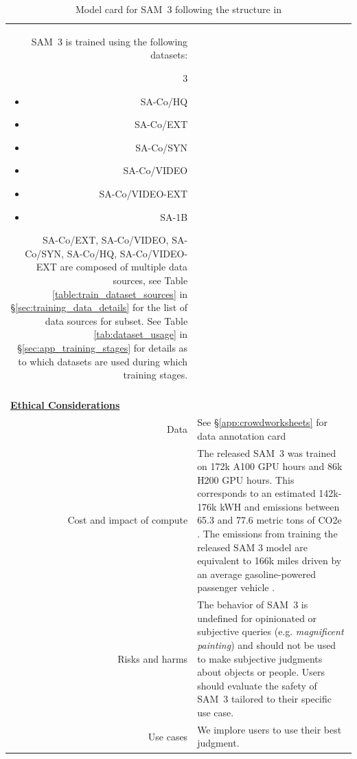 \documentclass[]{fairmeta}
\newcommand{\model}{SAM~3\xspace}
\newcommand{\dsname}{{SA-Co}\xspace}
\newcommand{\trainhq}{{\dsname/HQ}\xspace}
\newcommand{\trainsyn}{{\dsname/SYN}\xspace}
\newcommand{\trainext}{{\dsname/EXT}\xspace}
\newcommand{\trainvid}{{\dsname/VIDEO}\xspace}
\begin{document}
\begin{table}[!htbp]
\begin{tabular*}{\linewidth}{r|p{10cm}}
\model is trained using the following datasets:
\vspace{-1em}
\begin{multicols}{3}
\begin{itemize}
    \item \trainhq
    \item \trainext
    \item \trainsyn
    \item \trainvid
    \item \trainvid-EXT
    \item SA-1B
\end{itemize}
\end{multicols}
\vspace{-0.75em}
\trainext, \trainvid, \trainsyn, \trainhq,  \trainvid-EXT are composed of multiple data sources, see Table \ref{table:train_dataset_sources} in \S \ref{sec:training_data_details} for the list of data sources for subset. See Table \ref{tab:dataset_usage} in \S \ref{sec:app_training_stages} for details as to which datasets are used during which training stages. 
\\
\multicolumn{2}{c}{} \\
\multicolumn{2}{l}{\bf\underline{Ethical Considerations}} \\
Data &
See \S \ref{app:crowdworksheets} for data annotation card\\

Cost and impact of compute & The released \model was trained on 172k A100 GPU hours and 86k H200 GPU hours. This corresponds to an estimated 142k-176k kWH and emissions between 65.3 and 77.6 metric tons of CO2e \citep{patterson2021carbon, lacoste2019quantifying}. The emissions from training the released SAM 3 model are equivalent to 166k miles driven by an average gasoline-powered passenger vehicle \citep{epa2022}. \\
Risks and harms & The behavior of \model is undefined for opinionated or subjective queries (e.g. \textit{magnificent painting}) and should not be used to make subjective judgments about objects or people. Users should evaluate the safety of \model tailored to their specific use case.  \\
Use cases &  We implore users to use their best judgment. \\
\end{tabular*}
\label{tab:modelcard}

\caption{Model card for \model following the structure in \citep{mitchell2019model}}
\end{table}
\clearpage


	
\end{document}
